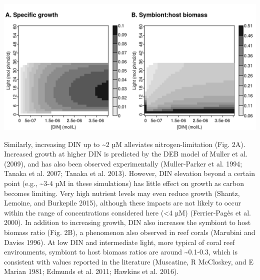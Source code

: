 \documentclass[]{elsarticle} %
\makeatletter
\def\maxwidth{\ifdim\Gin@nat@width>\linewidth\linewidth
\else\Gin@nat@width\fi}
\let\Oldincludegraphics\includegraphics
\renewcommand{\includegraphics}[1]{\Oldincludegraphics[width=\maxwidth]{#1}}
\makeatother
\begin{document}
\includegraphics{../img/Fig2.png}

Similarly, increasing DIN up to \textasciitilde{}2 µM alleviates
nitrogen-limitation (Fig. 2A). Increased growth at higher DIN is
predicted by the DEB model of Muller et al. (2009), and has also been
observed experimentally (Muller-Parker et al. 1994; Tanaka et al. 2007;
Tanaka et al. 2013). However, DIN elevation beyond a certain point
(e.g., \textasciitilde{}3-4 µM in these simulations) has little effect
on growth as carbon becomes limiting. Very high nutrient levels may even
reduce growth (Shantz, Lemoine, and Burkepile 2015), although these
impacts are not likely to occur within the range of concentrations
considered here (\textless{}4 µM) (Ferrier-Pagès et al. 2000). In
addition to increasing growth, DIN also increases the symbiont to host
biomass ratio (Fig. 2B), a phenomenon also observed in reef corals
(Marubini and Davies 1996). At low DIN and intermediate light, more
typical of coral reef environments, symbiont to host biomass ratios are
around \textasciitilde{}0.1-0.3, which is consistent with values
reported in the literature (Muscatine, R McCloskey, and E Marian 1981;
Edmunds et al. 2011; Hawkins et al. 2016).
\end{document}
